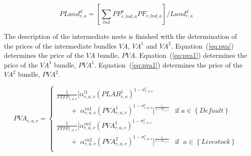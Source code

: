 \documentclass[11pt,letterpaper]{report}
\begin{document}
\begin{equation}
\label{eq:plandd}
\displaystyle
\mathit{PLand}^d_{r,a} = \left[\sum_{\mathit{lnd}}{\mathit{PF}^p_{r,\mathit{lnd},a} \mathit{PF}_{r,\mathit{lnd},a}}\right] / {\mathit{Land}^d_{r,a}}
\end{equation}

The description of the intermediate nests is finished with the determination of
the prices of the intermediate bundles $\mathit{VA}$, $\mathit{VA}^1$ and
$\mathit{VA}^2$. Equation~(\ref{eq:pva}) determines the price of the
$\mathit{VA}$ bundle, $\mathit{PVA}$. Equation~(\ref{eq:pva1}) determines the
price of the $\mathit{VA}^1$ bundle, $\mathit{PVA}^1$. Equation~(\ref{eq:pva1})
determines the price of the $\mathit{VA}^2$ bundle, $\mathit{PVA}^2$.

\begin{equation}
\label{eq:pva}
\mathit{PVA}_{r,a,v} =
\begin{cases}
   \displaystyle \frac{1}{\mathit{FTFP_{r,a,v}}} \biggl[ \alpha^{\mathit{l1}}_{\mathit{r,a,v}}
      \left( \mathit{PLAB}^1_{\mathit{r,a}}
      \right)^{1 - \sigma^{\mathit{v}}_{\mathit{r,a,v}}} \\
      \qquad + \; \alpha^{\mathit{va1}}_{\mathit{r,a,v}}
      \left( \mathit{PVA}^1_{\mathit{r,a,v}}
      \right)^{1 - \sigma^{\mathit{v}}_{\mathit{r,a,v}}}
   \biggr]^{\frac{1}{1 - \sigma^{\mathit{v}}_{\mathit{r,a,v}}}}
   & \textrm{if } a \in \left\{ \mathit{Default} \right\} \\
   \displaystyle \frac{1}{\mathit{FTFP_{r,a,v}}} \biggl[ \alpha^{\mathit{va1}}_{\mathit{r,a,v}}
      \left( \mathit{PVA}^1_{\mathit{r,a,v}}
      \right)^{1 - \sigma^{\mathit{v}}_{\mathit{r,a,v}}} \\
      \qquad + \; \alpha^{\mathit{va2}}_{\mathit{r,a,v}}
      \left( \mathit{PVA}^2_{\mathit{r,a,v}}
      \right)^{1 - \sigma^{\mathit{v}}_{\mathit{r,a,v}}}
   \biggr]^{\frac{1}{1 - \sigma^{\mathit{v}}_{\mathit{r,a,v}}}}
   & \textrm{if } \; a \in \left\{ \mathit{Livestock} \right\} \\
\end{cases}
\end{equation}
\end{document}
